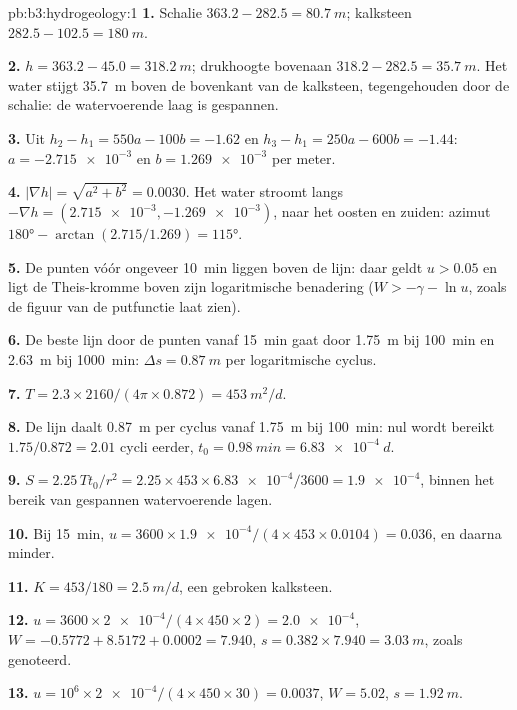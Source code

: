\begin{solution}{pb:b3:hydrogeology:1}
\textbf{1.} Schalie $363.2 - 282.5 = \qty{80.7}{m}$; kalksteen $282.5 -
102.5 = \qty{180}{m}$.

\textbf{2.} $h = 363.2 - 45.0 = \qty{318.2}{m}$; drukhoogte bovenaan
$318.2 - 282.5 = \qty{35.7}{m}$. Het water stijgt \qty{35.7}{m} boven de
bovenkant van de kalksteen, tegengehouden door de schalie: de watervoerende laag is gespannen.

\textbf{3.} Uit $h_2 - h_1 = 550a - 100b = -1.62$ en $h_3 - h_1 = 250a
- 600b = -1.44$: $a = \num{-2.715e-3}$ en $b = \num{1.269e-3}$ per
meter.

\textbf{4.} $|\nabla h| = \sqrt{a^2 + b^2} = \num{0.0030}$. Het water
stroomt langs $-\nabla h = (\num{2.715e-3}, \num{-1.269e-3})$, naar het oosten en
zuiden: azimut $\ang{180} - \arctan(2.715/1.269) = \ang{115}$.

\textbf{5.} De punten vóór ongeveer \qty{10}{min} liggen boven de lijn: daar
geldt $u > 0.05$ en ligt de Theis-kromme boven zijn logaritmische benadering
($W > -\gamma - \ln u$, zoals de figuur van de putfunctie laat zien).

\textbf{6.} De beste lijn door de punten vanaf \qty{15}{min} gaat
door \qty{1.75}{m} bij \qty{100}{min} en \qty{2.63}{m} bij \qty{1000}{min}:
$\Delta s = \qty{0.87}{m}$ per logaritmische cyclus.

\textbf{7.} $T = 2.3\times2160/(4\pi\times0.872) = \qty{453}{m^2/d}$.

\textbf{8.} De lijn daalt \qty{0.87}{m} per cyclus vanaf \qty{1.75}{m} bij
\qty{100}{min}: nul wordt bereikt $1.75/0.872 = 2.01$ cycli eerder,
$t_0 = \qty{0.98}{min} = \qty{6.83e-4}{d}$.

\textbf{9.} $S = 2.25\,Tt_0/r^2 = 2.25\times453\times\num{6.83e-4}/3600 =
\num{1.9e-4}$, binnen het bereik van gespannen watervoerende lagen.

\textbf{10.} Bij \qty{15}{min}, $u = 3600\times\num{1.9e-4}/(4\times453
\times0.0104) = \num{0.036}$, en daarna minder.

\textbf{11.} $K = 453/180 = \qty{2.5}{m/d}$, een gebroken kalksteen.

\textbf{12.} $u = 3600\times\num{2e-4}/(4\times450\times2) =
\num{2.0e-4}$, $W = -0.5772 + 8.5172 + 0.0002 = \num{7.940}$, $s =
0.382\times7.940 = \qty{3.03}{m}$, zoals genoteerd.

\textbf{13.} $u = 10^6\times\num{2e-4}/(4\times450\times30) =
\num{0.0037}$, $W = \num{5.02}$, $s = \qty{1.92}{m}$.


\end{solution}
